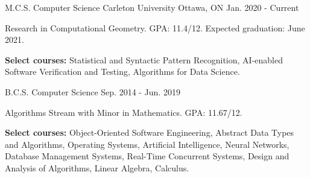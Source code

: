 \begin{cventries}

\educationentry
{M.C.S. Computer Science}
{Carleton University}
{Ottawa, ON}
{Jan. 2020 - Current}
{\begin{cvitems}
    \item {Research in Computational Geometry. GPA: 11.4/12. Expected graduation: June 2021.}
    \item {\textbf{Select courses:} Statistical and Syntactic Pattern Recognition, AI-enabled Software Verification and Testing, Algorithms for Data Science.}
\end{cvitems}}
{B.C.S. Computer Science}
{Sep. 2014 - Jun. 2019}
{\begin{cvitems}
    \item {Algorithms Stream with Minor in Mathematics. GPA: 11.67/12.}
    \item {\textbf{Select courses:} Object-Oriented Software Engineering, Abstract Data Types and Algorithms, Operating Systems, Artificial Intelligence, Neural Networks, Database Management Systems, Real-Time Concurrent Systems, Design and Analysis of Algorithms, Linear Algebra, Calculus.}
\end{cvitems}}

\end{cventries}
